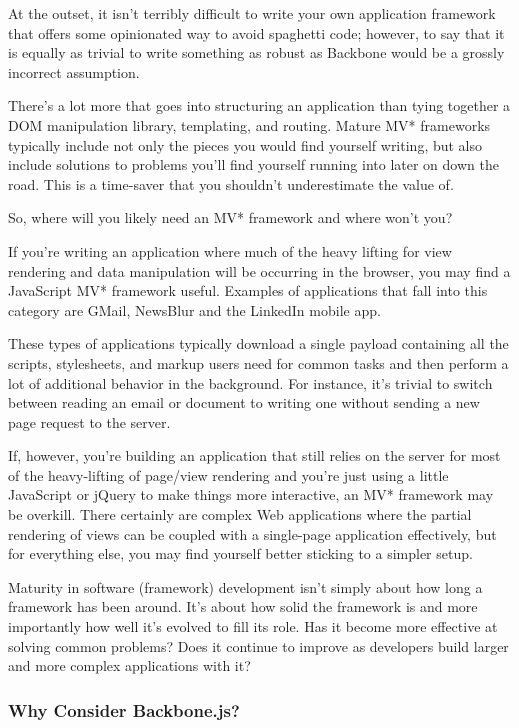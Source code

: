 \documentclass[9pt]{book}
\begin{document}
At the outset, it isn't terribly difficult to write your own application
framework that offers some opinionated way to avoid spaghetti code;
however, to say that it is equally as trivial to write something as
robust as Backbone would be a grossly incorrect assumption.

There's a lot more that goes into structuring an application than tying
together a DOM manipulation library, templating, and routing. Mature MV*
frameworks typically include not only the pieces you would find yourself
writing, but also include solutions to problems you'll find yourself
running into later on down the road. This is a time-saver that you
shouldn't underestimate the value of.

So, where will you likely need an MV* framework and where won't you?

If you're writing an application where much of the heavy lifting for
view rendering and data manipulation will be occurring in the browser,
you may find a JavaScript MV* framework useful. Examples of applications
that fall into this category are GMail, NewsBlur and the LinkedIn mobile
app.

These types of applications typically download a single payload
containing all the scripts, stylesheets, and markup users need for
common tasks and then perform a lot of additional behavior in the
background. For instance, it's trivial to switch between reading an
email or document to writing one without sending a new page request to
the server.

If, however, you're building an application that still relies on the
server for most of the heavy-lifting of page/view rendering and you're
just using a little JavaScript or jQuery to make things more
interactive, an MV* framework may be overkill. There certainly are
complex Web applications where the partial rendering of views can be
coupled with a single-page application effectively, but for everything
else, you may find yourself better sticking to a simpler setup.

Maturity in software (framework) development isn't simply about how long
a framework has been around. It's about how solid the framework is and
more importantly how well it's evolved to fill its role. Has it become
more effective at solving common problems? Does it continue to improve
as developers build larger and more complex applications with it?

\subsubsection{Why Consider
Backbone.js?}\label{why-consider-backbone.js}
\end{document}
